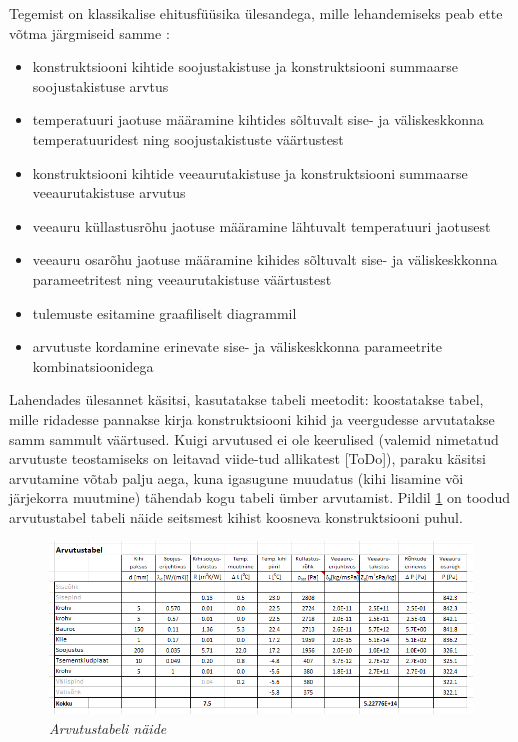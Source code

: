 Tegemist on klassikalise ehitusfüüsika ülesandega, mille lehandemiseks peab ette võtma järgmiseid samme \cite{iso_13788}:
\begin{itemize}
    \item konstruktsiooni kihtide soojustakistuse ja konstruktsiooni summaarse soojustakistuse arvtus
    \item temperatuuri jaotuse määramine kihtides sõltuvalt sise- ja väliskeskkonna temperatuuridest ning 
    soojustakistuste väärtustest
    \item konstruktsiooni kihtide veeaurutakistuse ja konstruktsiooni summaarse veeaurutakistuse arvutus
    \item veeauru küllastusrõhu jaotuse määramine lähtuvalt temperatuuri jaotusest
    \item veeauru osarõhu jaotuse määramine kihides sõltuvalt sise- ja väliskeskkonna parameetritest ning 
    veeaurutakistuse väärtustest
    \item tulemuste esitamine graafiliselt diagrammil
    \item arvutuste kordamine erinevate sise- ja väliskeskkonna parameetrite kombinatsioonidega
\end{itemize}

Lahendades ülesannet käsitsi, kasutatakse tabeli meetodit: koostatakse tabel, mille ridadesse pannakse 
kirja konstruktsiooni kihid ja veergudesse arvutatakse samm sammult väärtused. 
Kuigi arvutused ei ole keerulised (valemid nimetatud arvutuste teostamiseks on 
leitavad viide-tud allikatest [\colorbox{BurntOrange}{ToDo}]), paraku käsitsi arvutamine 
võtab palju aega, kuna igasugune muudatus (kihi lisamine või järjekorra muutmine) tähendab 
kogu tabeli ümber arvutamist. Pildil \ref{fig:excel_table_sample} on toodud arvutustabel tabeli näide
seitsmest kihist koosneva konstruktsiooni puhul.

\begin{figure}[ht]
    \centering
    \includegraphics[width=1\textwidth]{figures/problem_statement/04_calc_table.png}
    \caption[Näide niiskustehnilise analüüsi tulemuste esitamisest tabelis]{\textit{Arvutustabeli näide}}
    \label{fig:excel_table_sample}
\end{figure}

